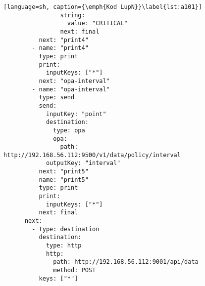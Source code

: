 \begin{lstlisting}[language=sh, caption={\emph{Kod LupN}}\label{lst:a101}]
                string: 
                  value: "CRITICAL"
                next: final
          next: "print4"
        - name: "print4"
          type: print
          print:
            inputKeys: ["*"]
          next: "opa-interval"
        - name: "opa-interval"
          type: send
          send: 
            inputKey: "point"
            destination: 
              type: opa
              opa: 
                path: http://192.168.56.112:9500/v1/data/policy/interval
            outputKey: "interval"
          next: "print5"
        - name: "print5"
          type: print
          print:
            inputKeys: ["*"]
          next: final
      next: 
        - type: destination
          destination: 
            type: http
            http: 
              path: http://192.168.56.112:9001/api/data
              method: POST
          keys: ["*"]
\end{lstlisting}